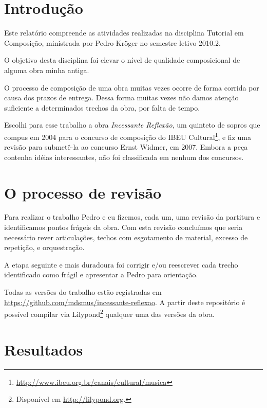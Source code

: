 \documentclass[10pt]{article}
\newcommand{\piece}[0]{\textit{Incessante Reflexão}}
\begin{document}

\section{Introdução}
\label{sec:introducao}

Este relatório compreende as atividades realizadas na disciplina
Tutorial em Composição, ministrada por Pedro Kröger no semestre letivo
2010.2.

O objetivo desta disciplina foi elevar o nível de qualidade
composicional de alguma obra minha antiga.

O processo de composição de uma obra muitas vezes ocorre de forma
corrida por causa dos prazos de entrega. Dessa forma muitas vezes não
damos atenção suficiente a determinados trechos da obra, por falta de
tempo.

Escolhi para esse trabalho a obra \piece{}, um quinteto de sopros que
compus em 2004 para o concurso de composição do IBEU
Cultural\footnote{\url{http://www.ibeu.org.br/canais/cultural/musica}},
e fiz uma revisão para submetê-la ao concurso Ernst Widmer, em
2007. Embora a peça contenha idéias interessantes, não foi
classificada em nenhum dos concursos.

\section{O processo de revisão}
\label{sec:o-processo-de}

Para realizar o trabalho Pedro e eu fizemos, cada um, uma revisão da
partitura e identificamos pontos frágeis da obra. Com esta revisão
concluímos que seria necessário rever articulações, techos com
esgotamento de material, excesso de repetição, e orquestração.

A etapa seguinte e mais duradoura foi corrigir e/ou reescrever cada
trecho identificado como frágil e apresentar a Pedro para orientação.

Todas as versões do trabalho estão registradas em
\url{https://github.com/mdsmus/incessante-reflexao}. A partir deste
repositório é possível compilar via Lilypond\footnote{Disponível em
  \url{http://lilypond.org}.} qualquer uma das versões da obra.

\section{Resultados}
\label{sec:resultados}
\end{document}
